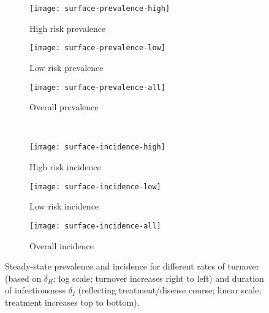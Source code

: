\begin{figure}
  \centering
  \begin{subfigure}{0.31\linewidth}
    \centering
    \texttt{[image: surface-prevalence-high]}
    \caption{High risk prevalence}
    \label{fig:surface-prevalence-high}
  \end{subfigure}
  \begin{subfigure}{0.31\linewidth}
    \centering
    \texttt{[image: surface-prevalence-low]}
    \caption{Low risk prevalence}
    \label{fig:surface-prevalence-low}
  \end{subfigure}
  \begin{subfigure}{0.31\linewidth}
    \centering
    \texttt{[image: surface-prevalence-all]}
    \caption{Overall prevalence}
    \label{fig:surface-prevalence-all}
  \end{subfigure}\\[1em]
  \begin{subfigure}{0.31\linewidth}
    \centering
    \texttt{[image: surface-incidence-high]}
    \caption{High risk incidence}
    \label{fig:surface-incidence-high}
  \end{subfigure}
  \begin{subfigure}{0.31\linewidth}
    \centering
    \texttt{[image: surface-incidence-low]}
    \caption{Low risk incidence}
    \label{fig:surface-incidence-low}
  \end{subfigure}
  \begin{subfigure}{0.31\linewidth}
    \centering
    \texttt{[image: surface-incidence-all]}
    \caption{Overall incidence}
    \label{fig:surface-incidence-all}
  \end{subfigure}
  \caption{Steady-state prevalence and incidence
    for different rates of turnover
    (based on $\delta_H$; log scale; turnover increases right to left)
    and duration of infectiousness $\delta_I$
    (reflecting treatment/disease course; linear scale; treatment increases top to bottom).}
  \label{fig:surface}
\end{figure}
